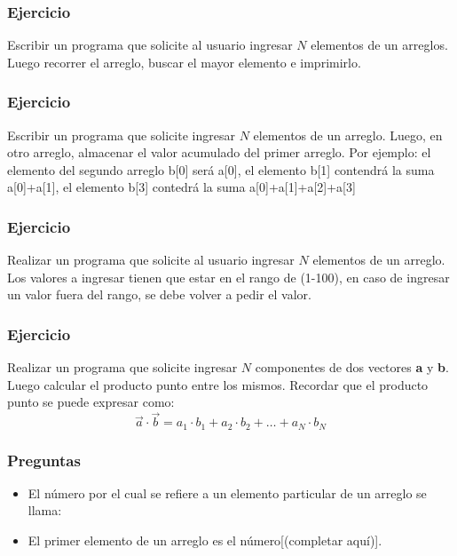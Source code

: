 \subsubsection{Ejercicio}
Escribir un programa que solicite al usuario ingresar $N$ elementos de un arreglos. Luego recorrer el arreglo, buscar el mayor elemento e imprimirlo.
{\small
  \lstset{inputencoding=utf8/latin1}
  
}

\subsubsection{Ejercicio}
Escribir un programa que solicite ingresar $N$ elementos de un arreglo. Luego, en otro arreglo, almacenar el valor acumulado del primer arreglo. Por ejemplo: el elemento del segundo arreglo b[0] será a[0], el elemento b[1] contendrá la suma a[0]+a[1], el elemento b[3] contedrá la suma a[0]+a[1]+a[2]+a[3]
{\small
  \lstset{inputencoding=utf8/latin1}
  
}

\subsubsection{Ejercicio}
Realizar un programa que solicite al usuario ingresar $N$ elementos de un arreglo. Los valores a ingresar tienen que estar en el rango de (1-100), en caso de ingresar un valor fuera del rango, se debe volver a pedir el valor.
{\small
  \lstset{inputencoding=utf8/latin1}
  
}
\subsubsection{Ejercicio}
Realizar un programa que solicite ingresar $N$ componentes de dos vectores \textbf{a} y \textbf{b}. Luego calcular el producto punto entre los mismos.
Recordar que el producto punto se puede expresar como:
$$\overrightarrow{a}\cdot \overrightarrow{b} = a_1\cdot b_1 + a_2\cdot b_2 +\dots + a_N\cdot b_N$$
{\small
  \lstset{inputencoding=utf8/latin1}
  
}

\subsubsection{Preguntas} 
\begin{itemize}
  \item El número por el cual se refiere a un elemento particular de un arreglo se llama:
  \item El primer elemento de un arreglo es el número[(completar aquí)].
\end{itemize}

